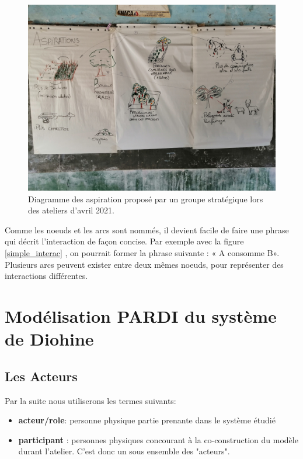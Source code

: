 \begin{figure}
  \begin{center}
  \includegraphics[width=15cm]{img/aspiration_formulee.jpg}
  \end{center}
  \caption{Diagramme des aspiration proposé par un groupe stratégique lors des ateliers d'avril 2021.}
  \label{aspiration}
\end{figure}


Comme les noeuds et les arcs sont nommés, il devient facile de faire une phrase qui décrit l'interaction de façon concise. Par exemple avec la figure \ref{simple_interac} , on pourrait former la phrase suivante : « A consomme B». Plusieurs arcs peuvent exister entre deux mêmes noeuds, pour représenter des interactions différentes.


\section{Modélisation PARDI du système de Diohine}

\subsection{Les Acteurs}

Par la suite nous utiliserons les termes suivants:
\begin{itemize}
  \item \textbf{acteur/role}: personne physique partie prenante dans le système étudié
  \item \textbf{participant} : personnes physiques concourant à la co-construction du modèle durant l'atelier. C'est donc un sous ensemble des "acteurs".
\end{itemize}

